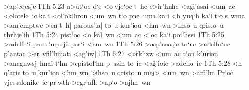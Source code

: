 >ap'eqesje\bibvsend
\vs 1Th 5:23
a>ut`oc
d`e
<o
vje`oc
t~hc
e>ir'hnhc
<agi'asai
<um~ac
<olotele~ic
ka`i
<ol'oklhron
<um~wn
t`o
pne~uma
ka`i
<h
yuq`h
ka`i
t`o
s~wma
>am'emptwc
>en
t~h|
parous'ia|
to~u
kur'iou
<hm~wn
>ihso~u
qristo~u
thrhje'ih\bibvsend
\vs 1Th 5:24
pist`oc
<o
kal~wn
<um~ac
<`oc
ka`i
poi'hsei\bibvsend
\vs 1Th 5:25
>adelfo`i
prose'uqesj\r{e}
per`i
<hm~wn\bibvsend
\vs 1Th 5:26
>asp'asasje
to`uc
>adelfo`uc
p'antac
>en
vfil'hmati
<ag'iw|\bibvsend
\vs 1Th 5:27
<o\r{r}k'izw
<um~ac
t`on
k'urion
>anagnwsj~hnai
t`hn
>epistol`hn
p~asin
to~ic
<a\r{g}'ioic
>adelfo~ic\bibvsend
\vs 1Th 5:28
<h
q'aric
to~u
kur'iou
<hm~wn
>ihso~u
qristo~u
mej>
<um~wn
>a\r{m}'hn\bibvsend
{}
Pr`oc\r{}
vjessalonike~ic
pr'wth
>egr'afh
>ap`o
>ajhn~wn\bibvsend
